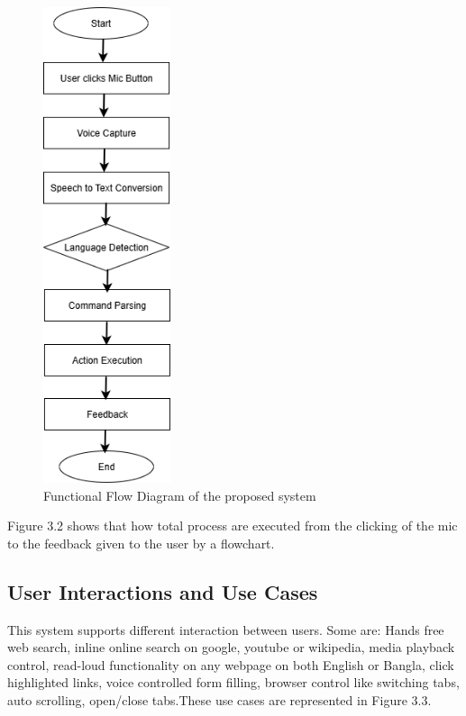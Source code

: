 \begin{figure}[H]
   \centering
   \includegraphics[height=5.5in]{latex/Chap3/Flow-diagram.png}
   \caption{Functional Flow Diagram of the proposed system}
   \label{fig:flow-diagram}
\end{figure}

 Figure 3.2 shows that how total process are executed from the clicking of the mic to the feedback given to the user by a flowchart.
 
\subsection{User Interactions and Use Cases}
This system supports different interaction between users. Some are: Hands free web search, inline online search on google, youtube or wikipedia, media playback control, read-loud functionality on any webpage on both English or Bangla, click highlighted links, voice controlled form filling, browser control like switching tabs, auto scrolling, open/close tabs.These use cases are represented in Figure 3.3.

